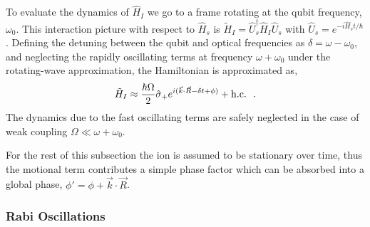 To evaluate the dynamics of $\hat H_I$ we go to a frame rotating at the qubit frequency, $\omega_0$. This interaction picture with respect to $\hat H_s$ is $\tilde H_I = \hat U_s^\dagger \hat H_I \hat U_s$ with $\hat U_s = e^{-i\hat H_s t/\hbar}$. 
Defining the detuning between the qubit and optical frequencies as $\delta = \omega-\omega_0$, and neglecting the rapidly oscillating terms at frequency $\omega+\omega_0$ under the rotating-wave approximation, the Hamiltonian is approximated as,
\begin{equation}
    \label{eqn:light_matter}
    \tilde H_I \approx \frac{\hbar\Omega}{2}\hat\sigma_+ e^{i(\vec k\cdot \vec R - \delta t + \phi)} + {\rm h.c.}~~.
\end{equation}
The dynamics due to the fast oscillating terms are safely neglected in the case of weak coupling $\Omega \ll \omega + \omega_0$.

For the rest of this subsection the ion is assumed to be stationary over time, thus the motional term contributes a simple phase factor which can be absorbed into a global phase, $\phi' = \phi + \vec k\cdot\vec R$. 

\subsubsection{Rabi Oscillations}
\label{sec:rabi_oscillations}

